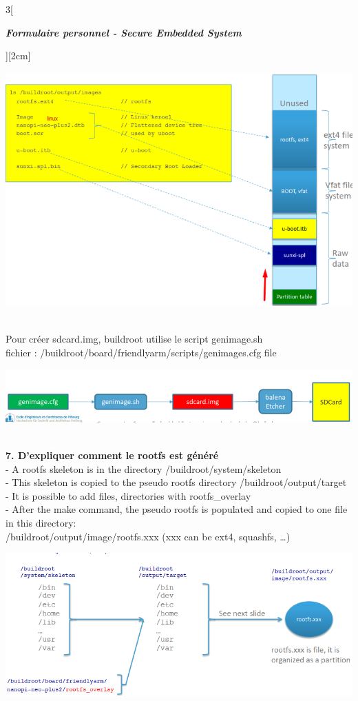 \begin{multicols}{3}[\centerline{ \large\em \textbf{Formulaire personnel - Secure Embedded System}}][2cm]
\begin{minipage}{\linewidth}
    \includegraphics[width =0.8\columnwidth]{images/5.png}
\end{minipage}\\
Pour créer sdcard.img, buildroot utilise le script genimage.sh \\
fichier : /buildroot/board/friendlyarm/scripts/genimages.cfg file\\
\begin{minipage}{\linewidth}
	\centering
    \includegraphics[width =0.8\columnwidth]{images/11.png}
\end{minipage}
\\ \textbf{7. D’expliquer comment le rootfs est généré\\}
- A rootfs skeleton is in the directory /buildroot/system/skeleton\\
- This skeleton is copied to the pseudo rootfs directory /buildroot/output/target\\
- It is possible to add files, directories with rootfs\_overlay\\
- After the make command, the pseudo rootfs is populated and copied to one file in this directory: \\
/buildroot/output/image/rootfs.xxx (xxx can be ext4,
squashfs, …)\\
\begin{minipage}{\linewidth}
	\centering
    \includegraphics[width =0.6\columnwidth]{images/6.png}

\end{minipage}
\end{multicols}
